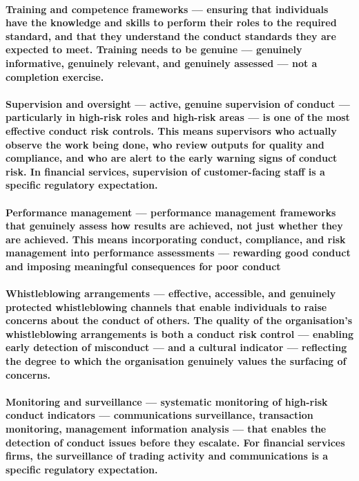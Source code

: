 \paragraph{\textbf{Training and competence frameworks} — ensuring that individuals have the knowledge and skills to perform their roles to the required standard, and that they understand the conduct standards they are expected to meet. Training needs to be genuine — genuinely informative, genuinely relevant, and genuinely assessed — not a completion exercise.}
\paragraph{\textbf{Supervision and oversight} — active, genuine supervision of conduct — particularly in high-risk roles and high-risk areas — is one of the most effective conduct risk controls. This means supervisors who actually observe the work being done, who review outputs for quality and compliance, and who are alert to the early warning signs of conduct risk. In financial services, supervision of customer-facing staff is a specific regulatory expectation.}
\paragraph{\textbf{Performance management} — performance management frameworks that genuinely assess how results are achieved, not just whether they are achieved. This means incorporating conduct, compliance, and risk management into performance assessments — rewarding good conduct and imposing meaningful consequences for poor conduct}
\paragraph{\textbf{Whistleblowing arrangements} — effective, accessible, and genuinely protected whistleblowing channels that enable individuals to raise concerns about the conduct of others. The quality of the organisation's whistleblowing arrangements is both a conduct risk control — enabling early detection of misconduct — and a cultural indicator — reflecting the degree to which the organisation genuinely values the surfacing of concerns.}
\paragraph{\textbf{Monitoring and surveillance} — systematic monitoring of high-risk conduct indicators — communications surveillance, transaction monitoring, management information analysis — that enables the detection of conduct issues before they escalate. For financial services firms, the surveillance of trading activity and communications is a specific regulatory expectation.}

